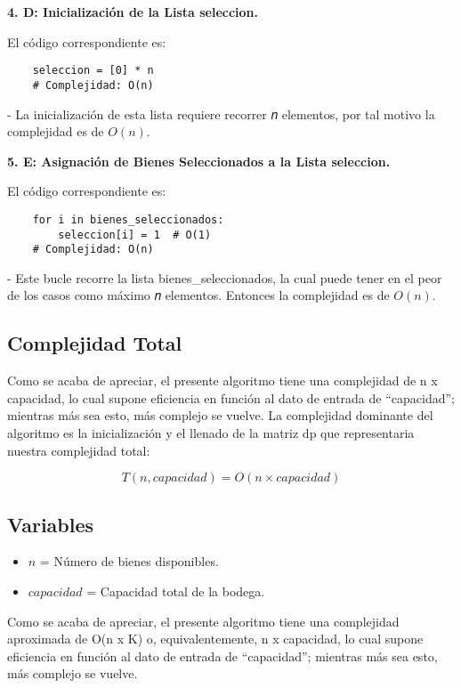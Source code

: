 \textbf{4. D: Inicialización de la Lista seleccion.}

El código correspondiente es:
\begin{lstlisting}
	seleccion = [0] * n
	# Complejidad: O(n)
\end{lstlisting}
- La inicialización de esta lista requiere recorrer 𝑛 elementos, por tal motivo la complejidad es de \( O(n) \).

\textbf{5. E: Asignación de Bienes Seleccionados a la Lista seleccion.}

El código correspondiente es:
\begin{lstlisting}
	for i in bienes_seleccionados:
		seleccion[i] = 1  # O(1)
	# Complejidad: O(n)
\end{lstlisting}
- Este bucle recorre la lista bienes_seleccionados, la cual puede tener en el peor de los casos como máximo 𝑛 elementos. Entonces la complejidad es de \( O(n) \).


\subsection*{Complejidad Total}

Como se acaba de apreciar, el presente algoritmo tiene una complejidad de n x capacidad, lo cual supone eficiencia en función al dato de entrada de “capacidad”; mientras más sea esto, más complejo se vuelve.
La complejidad dominante del algoritmo es la inicialización y el llenado de la matriz dp que representaria nuestra complejidad total:

\[
T(n, capacidad) = O(n \times capacidad)
\]

\subsection*{Variables}

\begin{itemize}
	\item \( n \) = Número de bienes disponibles.
	\item \( capacidad \) = Capacidad total de la bodega.
\end{itemize}




Como se acaba de apreciar, el presente algoritmo tiene una complejidad aproximada de O(n x K) o, equivalentemente, n x capacidad, lo cual supone eficiencia en función al dato de entrada de “capacidad”; mientras más sea esto, más complejo se vuelve.

